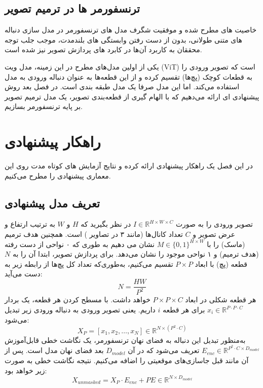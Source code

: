 \section{ترنسفورمر ها در ترمیم تصویر}

خاصیت های مطرح شده و موفقیت شگرف مدل های ترنسفورمر
\cite{radfordLanguageModelsAre2019}
\cite{brownLanguageModelsAre2020}
\cite{openaiGPT4TechnicalReport2024}
در مدل سازی دنباله های متنی طولانی، بدون از دست رفتن وابستگی های بلندمدت، موجب جلب توجه محققان به کاربرد آن‌ها در کابرد های پردازش تصویر نیز شده است.
\cite{liuSwinTransformerHierarchical2021}


یکی از اولین مدل‌های مطرح در این زمینه، مدل ویت (ViT) 
\cite{dosovitskiyImageWorth16x162021}
است که تصویر ورودی را به قطعات کوچک (پچ‌ها) تقسیم کرده و از این قطعه‌ها به عنوان دنباله ورودی به مدل استفاده می‌کند. اما این مدل صرفا یک مدل طبقه بندی است. در فصل بعد روش پیشنهادی ای ارائه می‌دهیم که با الهام گیری از قطعه‌بندی تصویر، یک مدل ترمیم تصویر بر پایه ترنسفورمر بسازیم. 



\chapter{راهکار پیشنهادی}

در این فصل یک راهکار پیشنهادی ارائه کرده و نتایج آزمایش های کوتاه مدت روی این معماری پیشنهادی را مطرح می‌کنیم.

\section{تعریف مدل پیشنهادی}

تصویر ورودی را به صورت $I \in \mathbb{R}^{H \times W \times C}$ در نظر بگیرید که $H$ و $W$ به ترتیب ارتفاع و عرض تصویر و $C$ تعداد کانال‌ها (مانند ۳ در تصاویر ) است. همچنین هدف ترمیم (ماسک) را با
$M \in \{0,1\}^{H \times W} $
نشان می دهیم به طوری که ۰ نواحی از دست رفته (هدف ترمیم) و ۱ نواحی موجود را نشان می‌دهد. برای پردازش تصویر، ابتدا آن را به $N$ قطعه (پچ) با ابعاد $P \times P$ تقسیم می‌کنیم، به‌طوری‌که تعداد کل پچ‌ها از رابطه زیر به دست می‌آید:
\[
N = \frac{HW}{P^2}
\]
هر قطعه شکلی در ابعاد ${P \times P \times C}$ خواهد داشت. با مسطح کردن هر قطعه، یک بردار 
$x_i \in \mathbb{R}^{P \cdot P \cdot C}$
برای هر قطعه $i$ داریم. یعنی تصویر ورودی به دنباله ورودی زیر تبدیل می‌شود:
\[
X_P = [x_1, x_2, \dots, x_N] \in \mathbb{R}^{N \times (P^2 \cdot C)}
\]
به‌منظور تبدیل این دنباله به فضای نهان ترنسفورمر، یک نگاشت خطی قابل‌آموزش $E_{enc} \in \mathbb{R}^{P^2 \cdot C \times D_{model}}$ تعریف می‌شود که در آن $D_{model}$ بعد فضای نهان مدل است. پس از آن مانند قبل جاسازی‌های موقعیتی را اضافه می‌کنیم.
 نتیجه نگاشت خطی به صورت زیر خواهد بود:
$$
X_{unmasked} = X_P \cdot E_{enc} + PE \in \mathbb{R}^{N \times D_{model}}
$$


